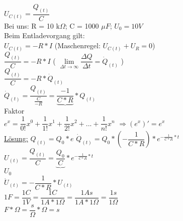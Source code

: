 \documentclass[12pt]{scrartcl}
\begin{document}
\begin{flushleft}
		$ U_{C(t)} = \dfrac{Q_{(t)}}{C} $
		\vspace{2mm} \\
		Bei uns: R = 10 k$\Omega$; C = 1000 $ \mu F $; $U_{0} = 10V$ \\
		Beim Entladevorgang gilt: \\
		\vspace{3mm}
		$ U_{C(t)} = -R \ast I $ \hspace{40mm} (Maschenregel: $U_{C(t)} + U_{R} = 0$)
		\vspace{5mm} \\
		$ \dfrac{Q_{(t)}}{C} = -R \ast I $ \hspace{40mm} ( $\lim\limits_{\Delta t \rightarrow \infty}{\dfrac{\Delta Q}{\Delta t}} = \dot{Q}_{(t)}$ )
		\vspace{5mm} \\
		$ \dfrac{Q_{(t)}}{C} = -R \ast \dot{Q}_{(t)} $
		\vspace{5mm} \\
		$ \dot{Q}_{(t)} = \dfrac{Q_{(t)}}{\frac{C}{-R}} = \underbrace{\dfrac{-1}{C \ast R}} \ast Q_{(t)}$ \\
		\hspace{24mm} Faktor
		\vspace{5mm} \\
		$ e^{x} = \dfrac{1}{0!}x^{0} + \dfrac{1}{1!}x^{1} + \dfrac{1}{2!}x^{2} + ... + \dfrac{1}{n!}x^{n}$ \hspace{2mm} $ \Rightarrow (e^{x})' = e^{x} $
		\vspace{3mm} \\
		\underline{Lösung:} $ Q_{(t)} = Q_{0} \ast e $ \hspace{15mm} $ \dot{Q}_{(t)} = Q_{0} \ast (-\dfrac{1}{C \ast R}) \ast e^{-\frac{1}{C \ast R} \ast t} $
		\vspace{10mm} \\
		$ U_{(t)} = \dfrac{Q_{(t)}}{C} = \underbrace{\dfrac{Q_{0}}{C}} \ast e^{-\frac{1}{C \ast R} \ast t} $ \\
		\hspace{25.5mm} $U_{0}$
		\vspace{5mm} \\
		$ \dot{U}_{(t)} = - \dfrac{1}{C \ast R} \ast U_{(t)} $
		\vspace{5mm} \\
		$ 1F = \dfrac{1C}{1V} = \dfrac{1C}{1A \ast 1 \Omega} = \dfrac{1 As}{1A \ast 1 \Omega} = \dfrac{1s}{1 \Omega} $
		\vspace{5mm} \\
		$ F \ast \Omega = \dfrac{s}{\Omega} \ast \Omega = s $
		

\end{flushleft}
\end{document}
